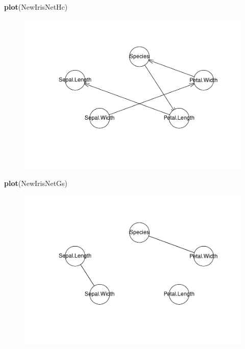 \documentclass[]{article}
\newenvironment{Shaded}{\begin{snugshade}}{\end{snugshade}}
\newcommand{\KeywordTok}[1]{\textcolor[rgb]{0.13,0.29,0.53}{\textbf{{#1}}}}
\newcommand{\NormalTok}[1]{{#1}}
\begin{document}
\begin{Shaded}
\begin{Highlighting}[]
\KeywordTok{plot}\NormalTok{(NewIrisNetHc)}
\end{Highlighting}
\end{Shaded}

\begin{figure}[htbp]
\centering
\includegraphics{BN_Ass2_files/figure-latex/unnamed-chunk-12-1.pdf}
\end{figure}

\begin{Shaded}
\begin{Highlighting}[]
\KeywordTok{plot}\NormalTok{(NewIrisNetGs)}
\end{Highlighting}
\end{Shaded}

\begin{figure}[htbp]
\centering
\includegraphics{BN_Ass2_files/figure-latex/unnamed-chunk-12-2.pdf}
\end{figure}
\end{document}
